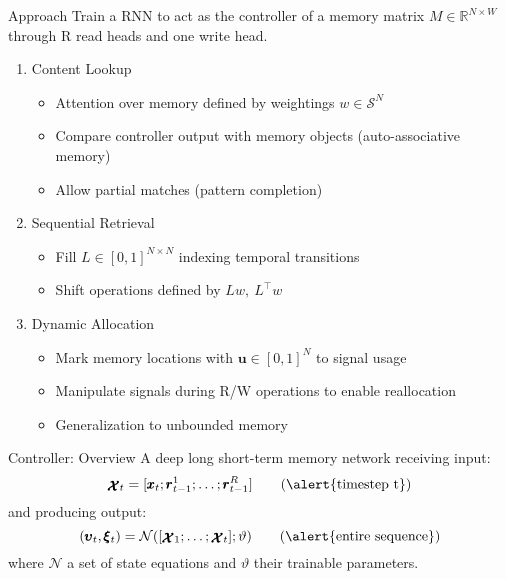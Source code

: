 \documentclass{beamer}
\newcommand{\xx}{\pmb{\raisebox{-1.5pt}{$\mathcal{X}$}}}
\begin{document}
\begin{frame}{Approach}
	Train a RNN to act as the \alert{controller} of a memory matrix $M \in \mathbb{R}^{N\times W}$ through R \alert{read heads} and one \alert{write head}.
	
	\pause
	\begin{enumerate}
	\item \alert{Content Lookup}\\
		\begin{itemize}
		\item \alert{Attention} over memory defined by weightings $w \in \mathcal{S}^N$
		\item Compare controller output with memory objects (\alert{auto-associative memory})
		\item Allow partial matches  (\alert{pattern completion})
		\end{itemize}
	\pause
	\item \alert{Sequential Retrieval}
		\begin{itemize} 
		\item Fill $L \in [0,1]^{N \times N}$ indexing \alert{temporal transitions}
		\item \alert{Shift} operations defined by $Lw,\ L^\top w$
		\end{itemize}
	\pause
	\item \alert{Dynamic Allocation}
		\begin{itemize}
		\item Mark memory locations with $\pmb{u} \in [0,1]^N$ to \alert{signal usage}
		\item Manipulate signals during R/W operations to enable \alert{reallocation}
		\item Generalization to \alert{unbounded memory}
		\end{itemize}
	\end{enumerate}
\end{frame}
	
\begin{frame}{Controller: Overview}
	A deep \alert{long short-term memory network} receiving input:
	\[
	\xx_t=[ \pmb{x}_t; \pmb{r}_{t-1}^1; \dots ;\pmb{r}_{t-1}^R] \tag{\text{\alert{timestep t}}}
	\]
	and producing output:
	\[
	(\pmb{\upsilon}_t,\pmb{\xi}_t)=\mathcal{N}([\xx_1;\dots;\xx_t];\vartheta) \tag{\text{\alert{entire sequence}}}
	\]
	where \alert{$\mathcal{N}$} a set of state equations and \alert{$\vartheta$} their trainable parameters.
\end{frame}
\end{document}
